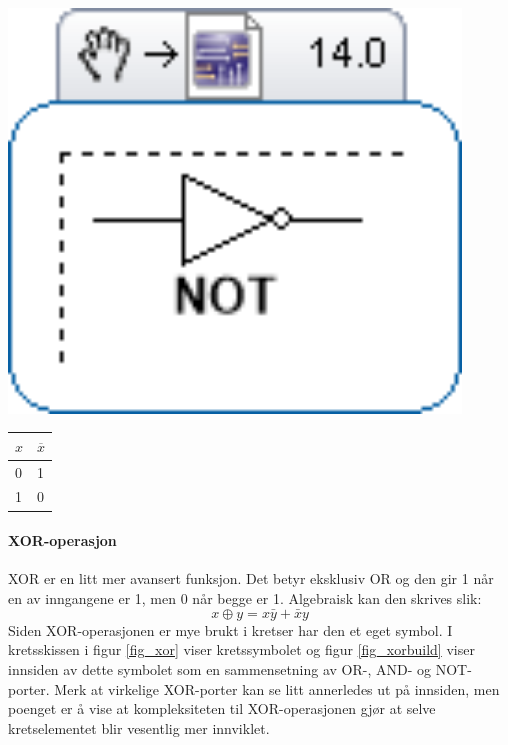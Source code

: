 \documentclass[11pt, a4paper, norwegian]{article}
\begin{document}
{\centering
\begin{minipage}{0.45\textwidth}
  \centering
  \includegraphics[width=0.9\textwidth]{port_not.png}
  \label{fig_not}
\end{minipage}
\begin{minipage}{0.45\textwidth}
  \centering
  \label{tbl_not}
  \begin{tabular}{|l||l|}
        \hline
        $x$ & $\overline{x}$ \\ 	\hline
        0 & 1 \\
        1 & 0 \\ \hline
  \end{tabular}
\end{minipage}
\endgraf\bigskip
}

\paragraph{XOR-operasjon}
XOR er en litt mer avansert funksjon. Det betyr eksklusiv OR og den gir 1 når en av inngangene er 1, men 0 når begge er 1. Algebraisk kan den skrives slik:
$$ x \oplus y = x\bar{y} + \bar{x}y$$
Siden XOR-operasjonen er mye brukt i kretser har den et eget symbol. I kretsskissen i figur \ref{fig_xor} viser kretssymbolet og figur \ref{fig_xorbuild} viser innsiden av dette symbolet som en sammensetning av OR-, AND- og NOT-porter. Merk at virkelige XOR-porter kan se litt annerledes ut på innsiden, men poenget er å vise at kompleksiteten til XOR-operasjonen gjør at selve kretselementet blir vesentlig mer innviklet. 
\end{document}
